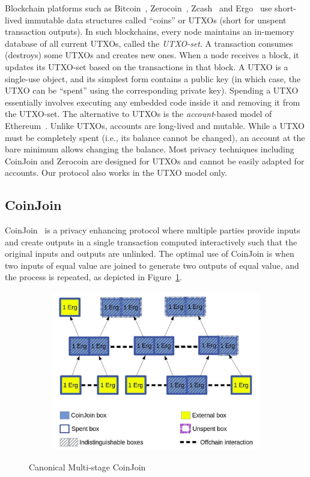 \documentclass[runningheads]{llncs}
\newcommand{\zerocoin}{Zerocoin\xspace}
\begin{document}
Blockchain platforms such as Bitcoin~\cite{Nak08}, \zerocoin~\cite{zerocoin}, Zcash~\cite{zcash} and Ergo~\cite{ergo} use short-lived immutable data structures called ``coins'' or UTXOs (short for {unspent transaction outputs}). In such blockchains, every node maintains an in-memory database of all current UTXOs, called the {\em UTXO-set}. A transaction consumes (destroys) some UTXOs and creates new ones. When a node receives a block, it updates its UTXO-set based on the transactions in that block. A UTXO is a single-use object, and its simplest form contains a public key (in which case, the UTXO can be ``spent'' using the corresponding private key). Spending a UTXO essentially involves executing any embedded code inside it and removing it from the UTXO-set. 
The alternative to UTXOs is the {\em account}-based model of Ethereum~\cite{wood2014ethereum}. Unlike UTXOs, accounts are long-lived and mutable. While a UTXO must be completely spent (i.e., its balance cannot be changed), an account at the bare minimum allows changing the balance. Most privacy techniques including CoinJoin and \zerocoin are designed for UTXOs and cannot be easily adapted for accounts. Our protocol also works in the UTXO model only. 

\subsection{CoinJoin} 
\label{coinjoin}
CoinJoin~\cite{coinjoin} is a privacy enhancing protocol where multiple parties provide inputs and create outputs in a single transaction computed interactively such that the original inputs and outputs are unlinked. The optimal use of CoinJoin is when two inputs of equal value are joined to generate two outputs of equal value, and the process is repeated, as depicted in Figure~\ref{fig:coinjoin}. 

\begin{figure}[h]
	\centering
	\begin{subfigure}{.575\textwidth}
		\centering
		\includegraphics[width=\linewidth]{CoinJoin.jpg}
	\end{subfigure}%
	\caption{Canonical Multi-stage CoinJoin}
	\label{fig:coinjoin}
\end{figure}
\end{document}

